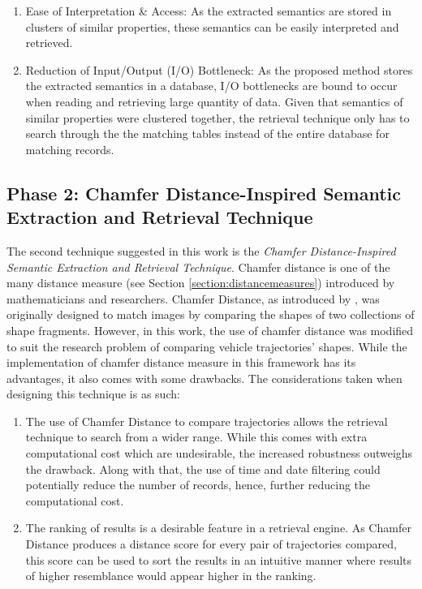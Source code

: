 \begin{enumerate}
    \item Ease of Interpretation \& Access: As the extracted semantics are stored in clusters of similar properties, these semantics can be easily interpreted and retrieved.
    \item Reduction of Input/Output (I/O) Bottleneck: As the proposed method stores the extracted semantics in a database, I/O bottlenecks are bound to occur when reading and retrieving large quantity of data. Given that semantics of similar properties were clustered together, the retrieval technique only has to search through the the matching tables instead of the entire database for matching records.
\end{enumerate}


\subsection{Phase 2: Chamfer Distance-Inspired Semantic Extraction and Retrieval Technique}
The second technique suggested in this work is the \textit{Chamfer Distance-Inspired Semantic Extraction and Retrieval Technique}.
Chamfer distance is one of the many distance measure (see Section \ref{section:distancemeasures}) introduced by mathematicians and researchers. Chamfer Distance, as introduced by \cite{barrow1977parametric}, was originally designed to match images by comparing the shapes of two collections of shape fragments.
However, in this work, the use of chamfer distance was modified to suit the research problem of comparing vehicle trajectories' shapes. While the implementation of chamfer distance measure in this framework has its advantages, it also comes with some drawbacks. The considerations taken when designing this technique is as such:

\begin{enumerate}
    \item The use of Chamfer Distance to compare trajectories allows the retrieval technique to search from a wider range. While this comes with extra computational cost which are undesirable, the increased robustness outweighs the drawback. Along with that, the use of time and date filtering could potentially reduce the number of records, hence, further reducing the computational cost.
    \item The ranking of results is a desirable feature in a retrieval engine. As Chamfer Distance produces a distance score for every pair of trajectories compared, this score can be used to sort the results in an intuitive manner where results of higher resemblance would appear higher in the ranking.
\end{enumerate}


